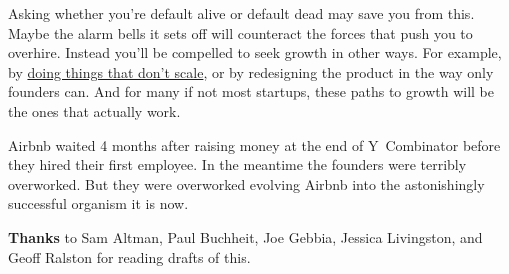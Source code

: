 Asking whether you're default alive or default dead may save you from
this. Maybe the alarm bells it sets off will counteract the forces that
push you to overhire. Instead you'll be compelled to seek growth in
other ways. For example, by \href{ds.html}{doing things that don't
scale}, or by redesigning the product in the way only founders can. And
for many if not most startups, these paths to growth will be the ones
that actually work.

Airbnb waited 4 months after raising money at the end of Y~Combinator
before they hired their first employee. In the meantime the founders
were terribly overworked. But they were overworked evolving Airbnb into
the astonishingly successful organism it is now.


\textbf{Thanks} to Sam Altman, Paul Buchheit, Joe Gebbia, Jessica
Livingston, and Geoff Ralston for reading drafts of this.